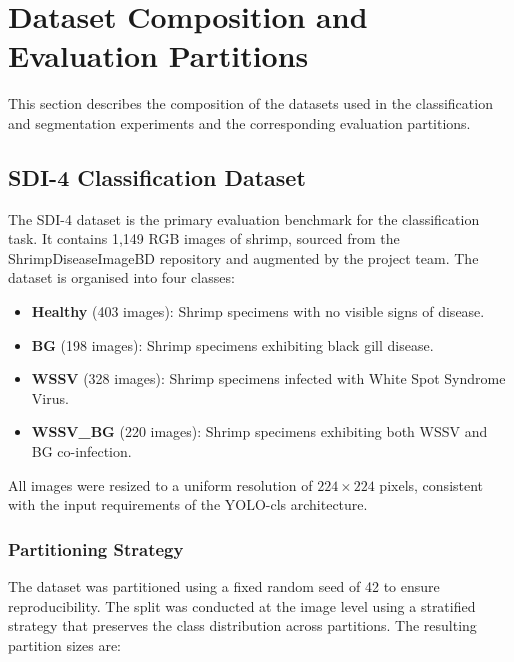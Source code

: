 
\section{Dataset Composition and Evaluation Partitions}
\label{sec:dataset-partitions}

This section describes the composition of the datasets used in the classification and segmentation experiments and the corresponding evaluation partitions.

\subsection{SDI-4 Classification Dataset}
\label{sec:sdi4-dataset}

The SDI-4 dataset is the primary evaluation benchmark for the classification task. It contains 1,149 RGB images of shrimp, sourced from the ShrimpDiseaseImageBD repository and augmented by the project team. The dataset is organised into four classes:

\begin{itemize}
    \item \textbf{Healthy} (403 images): Shrimp specimens with no visible signs of disease.
    \item \textbf{BG} (198 images): Shrimp specimens exhibiting black gill disease.
    \item \textbf{WSSV} (328 images): Shrimp specimens infected with White Spot Syndrome Virus.
    \item \textbf{WSSV\_BG} (220 images): Shrimp specimens exhibiting both WSSV and BG co-infection.
\end{itemize}

All images were resized to a uniform resolution of \(224 \times 224\) pixels, consistent with the input requirements of the YOLO-cls architecture.

\subsubsection{Partitioning Strategy}
\label{sec:sdi4-partition}

The dataset was partitioned using a fixed random seed of 42 to ensure reproducibility. The split was conducted at the image level using a stratified strategy that preserves the class distribution across partitions. The resulting partition sizes are:

